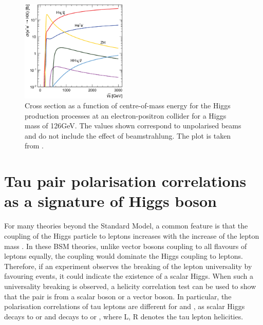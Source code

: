 \begin{figure}[!htbp]
\centering
\includegraphics[width=0.45\textwidth]{theory/HiggsCLICcrossSection}
\caption[]
{Cross section as a function of centre-of-mass energy for the Higgs production processes at an electron-positron collider for a Higgs mass of 126GeV. The values shown correspond
to unpolarised beams and do not include the effect of beamstrahlung. The plot is taken from \cite{Abramowicz:2016zbo}.}
\label{fig:theoryHiggsCrossSection}
\end{figure}


\section{Tau pair polarisation correlations as a signature of Higgs boson}
\label{sec:theoryTauPair}
For many theories beyond the Standard Model, a common feature is that the coupling of the Higgs particle to leptons increases with the increase of the lepton mass \cite{Duperrin:2008in}.  In these BSM theories, unlike vector bosons coupling to all flavours of leptons equally, the \HigssTauTau coupling would dominate the Higgs coupling to leptons. Therefore, if an experiment observes the breaking of the lepton universality by favouring \TauTau events, it could indicate the existence of a scalar Higgs. When such a universality breaking is observed, a helicity correlation test can be used to show that the \TauTau pair is from a scalar boson or a vector boson. In particular, the polarisation correlations of tau leptons are different for \HiggsToTauTau and \ZToTauTau, as scalar Higgs decays to  or  and \PZ decays to  or , where L, R denotes the tau lepton helicities.


